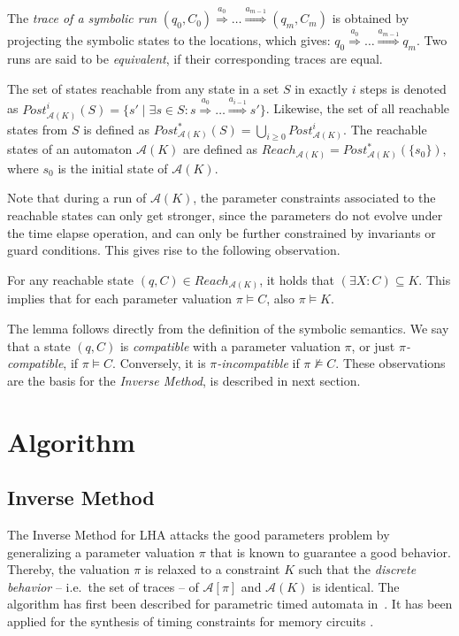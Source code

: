 \documentclass{llncs}
\newcommand{\A}{\ensuremath{\mathcal{A}}}
\newcommand{\Trans}[1]{\ensuremath{\overset{#1}{\Rightarrow}}}
\begin{document}
The {\em trace of a symbolic run} $(q_0, C_0) \Trans{a_0} \dots
\Trans{a_{m-1}} (q_m, C_m)$ is obtained by projecting the symbolic
states to the locations, which gives: $q_0 \Trans{a_0} \dots
\Trans{a_{m-1}} q_m$. Two runs are said to be {\em equivalent}, if
their corresponding traces are equal.

The set of states reachable from any state in a set $S$ in exactly $i$
steps is denoted as $Post^{i}_{\A(K)}(S) = \{s' \mid \exists s \in S: s \Trans{a_{0}} \dots
\Trans{a_{i-1}} s'\}$. Likewise, the set of all reachable states from
$S$ is defined as $Post^{*}_{\A(K)}(S) = \bigcup_{i\geq
  0}Post^{i}_{\A(K)}$. The reachable states of an automaton $\A(K)$
are defined as $Reach_{\A(K)} = Post^{*}_{\A(K)}(\{s_0\})$, where
$s_0$ is the initial state of $\A(K)$.

Note that during a run of $\A(K)$, the parameter
constraints associated to the reachable states can only get stronger,
since the parameters do not evolve under the time elapse operation,
and can only be further constrained by invariants or guard
conditions. This gives rise to the following observation.

\begin{lemma}\label{lem:narrow}
  For any reachable state $(q,C) \in Reach_{\A(K)}$, it holds that
  $(\exists X: C) \subseteq K$. This implies that for each parameter
  valuation $\pi \models C$, also $\pi \models K$. 
\end{lemma}

The lemma follows directly from the definition of the symbolic
semantics. We say that a state $(q,C)$ is \emph{compatible} with a
parameter valuation $\pi$, or just \emph{$\pi$-compatible}, if $\pi
\models C$. Conversely, it is \emph{$\pi$-incompatible} if $\pi
\not\models C$.
%
These observations are the basis for the \emph{Inverse Method}, 
is described in next  section.

\section{Algorithm}\label{sec:algo}
\subsection{Inverse Method}

The Inverse Method for LHA attacks the good parameters problem by
generalizing a parameter valuation $\pi$ that is known to guarantee a
good behavior. Thereby, the valuation $\pi$ is relaxed to a constraint
$K$ such that the \emph{discrete behavior} -- i.e.~the set of
traces -- of $\A[\pi]$ and $\A(K)$ is identical. The algorithm has
first been described for parametric timed automata
in~\cite{ACEF:2009}. It has been applied for the synthesis of timing
constraints for memory circuits \cite{And:2009}.
\end{document}
